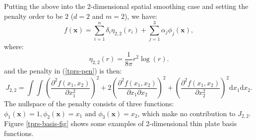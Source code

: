Putting the above into the 2-dimensional spatial smoothing case and setting the penalty order to be $2$ ($d=2$ and $m=2$), we have:
\begin{equation*}
f(\mathbf{x}) = \sum_{i=1}^n \delta_i \eta_{2,2}(r_i) + \sum_{j=1}^3 \alpha_j \phi_j(\mathbf{x}),
\end{equation*}
where:
\begin{equation*}
\eta_{2,2}(r) = \frac{1}{8\pi} r^2 \log(r).
\end{equation*}
and the penalty in (\ref{tprs-pen}) is then:
\begin{equation*}
J_{2,2} = \int \int \left ( \frac{\partial^2 f(x_1,x_2)}{\partial x_1^2} \right )^2 + 2\left ( \frac{\partial^2 f(x_1,x_2)}{\partial x_1  \partial x_2} \right )^2 + \left ( \frac{\partial^2 f(x_1,x_2)}{\partial x_2^2} \right )^2 \text{d} x_1 \text{d} x_2.
\end{equation*}
The nullspace of the penalty consists of three functions: $\phi_1(\mathbf{x})=1, \phi_2(\mathbf{x})=x_1 \text{ and } \phi_3(\mathbf{x})=x_2$, which make no contribution to $J_{2,2}$. Figure \ref{tprs-basis-fig} shows some examples of 2-dimensional thin plate basis functions.


